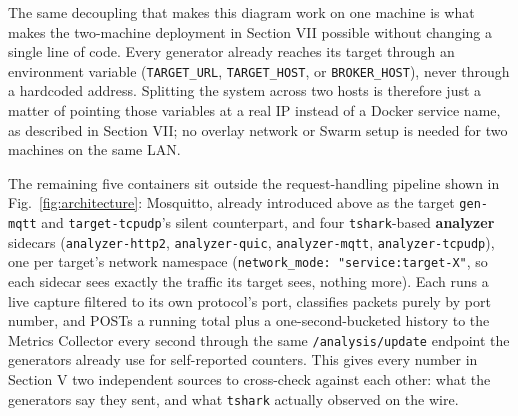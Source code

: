 The same decoupling that makes this diagram work on one machine is what makes
the two-machine deployment in Section VII possible without changing a single
line of code. Every generator already reaches its target through an
environment variable (\texttt{TARGET\_URL}, \texttt{TARGET\_HOST}, or
\texttt{BROKER\_HOST}), never through a hardcoded address. Splitting the
system across two hosts is therefore just a matter of pointing those
variables at a real IP instead of a Docker service name, as described in
Section VII; no overlay network or Swarm setup is needed for two machines on
the same LAN.

The remaining five containers sit outside the request-handling pipeline shown
in Fig.~\ref{fig:architecture}: Mosquitto, already introduced above as the
target \texttt{gen-mqtt} and \texttt{target-tcpudp}'s silent counterpart, and
four \texttt{tshark}-based \textbf{analyzer} sidecars
(\texttt{analyzer-http2}, \texttt{analyzer-quic}, \texttt{analyzer-mqtt},
\texttt{analyzer-tcpudp}), one per target's network namespace
(\texttt{network\_mode: "service:target-X"}, so each sidecar sees exactly the
traffic its target sees, nothing more). Each runs a live capture filtered to
its own protocol's port, classifies packets purely by port number, and POSTs
a running total plus a one-second-bucketed history to the Metrics Collector
every second through the same \texttt{/analysis/update} endpoint the
generators already use for self-reported counters. This gives every number in
Section V two independent sources to cross-check against each other: what the
generators say they sent, and what \texttt{tshark} actually observed on the
wire.

